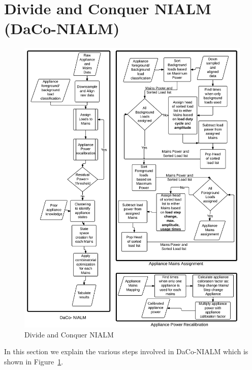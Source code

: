 \documentclass[conference]{IEEEtran}
\newcommand{\figref}[1]{Figure~\ref{#1}}
\begin{document}
\section{Divide and Conquer NIALM (DaCo-NIALM)}
\begin{figure}
\centering \includegraphics[scale=0.1]{./figures/algo_3.png}
\caption{Divide and Conquer NIALM}
   \label{fig:algorithm}
\end{figure}
In this section we explain the various steps involved in DaCo-NIALM which is shown in \figref{fig:algorithm}.
\end{document}
